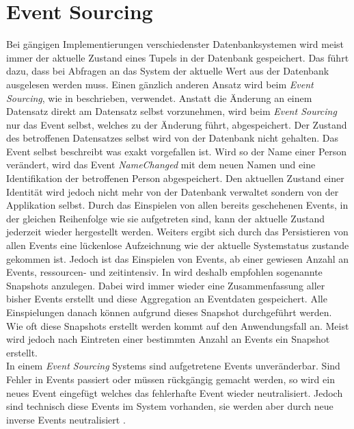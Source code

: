 \section{Event Sourcing}
\label{sec:eventSourcing}
Bei gängigen Implementierungen verschiedenster Datenbanksystemen wird meist immer der aktuelle Zustand eines Tupels in der Datenbank gespeichert. Das führt dazu, dass bei Abfragen an das System der aktuelle Wert aus der Datenbank ausgelesen werden muss. Einen gänzlich anderen Ansatz wird beim \textit{Event Sourcing}, wie in \cite{vernon2013implementing} beschrieben, verwendet. Anstatt die Änderung an einem Datensatz direkt am Datensatz selbst vorzunehmen, wird beim \textit{Event Sourcing} nur das Event selbst, welches zu der Änderung führt, abgespeichert. Der Zustand des betroffenen Datensatzes selbst wird von der Datenbank nicht gehalten. Das Event selbst beschreibt was exakt vorgefallen ist. Wird so der Name einer Person verändert, wird das Event \textit{NameChanged} mit dem neuen Namen und eine Identifikation der betroffenen Person abgespeichert. Den aktuellen Zustand einer Identität wird jedoch nicht mehr von der Datenbank verwaltet sondern von der Applikation selbst. Durch das Einspielen von allen bereits geschehenen Events, in der gleichen Reihenfolge wie sie aufgetreten sind, kann der aktuelle Zustand jederzeit wieder hergestellt werden. Weiters ergibt sich durch das Persistieren von allen Events eine lückenlose Aufzeichnung wie der aktuelle Systemstatus zustande gekommen ist. 
Jedoch ist das Einspielen von Events, ab einer gewiesen Anzahl an Events, ressourcen- und zeitintensiv. In \cite{vernon2013implementing} wird deshalb empfohlen sogenannte Snapshots  anzulegen. Dabei wird immer wieder eine Zusammenfassung aller bisher Events erstellt und diese Aggregation an Eventdaten gespeichert.  Alle Einspielungen danach können aufgrund dieses Snapshot durchgeführt werden. Wie oft diese Snapshots erstellt werden kommt auf den Anwendungsfall an. Meist wird jedoch nach Eintreten einer bestimmten Anzahl an Events ein Snapshot erstellt. \\
In einem  \textit{Event Sourcing} Systems sind aufgetretene Events unveränderbar. Sind Fehler in Events passiert oder müssen rückgängig gemacht werden, so wird ein neues Event eingefügt welches das fehlerhafte Event wieder neutralisiert. Jedoch sind technisch diese Events im System vorhanden, sie werden aber durch neue inverse Events  neutralisiert \citep{vernon2013implementing}.
